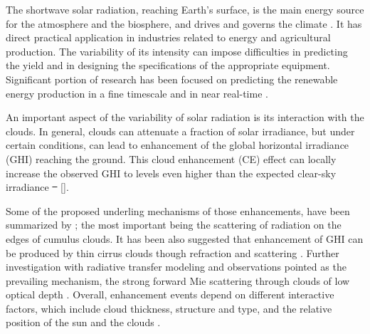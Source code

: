 \documentclass[preprint, 5p,
authoryear]{elsarticle} %
\providecommand{\DIFaddtex}[1]{{\protect\color{blue}\uwave{#1}}} %
\providecommand{\DIFdeltex}[1]{{\protect\color{red}\sout{#1}}}                      %
\providecommand{\DIFaddbegin}{} %
\providecommand{\DIFaddend}{} %
\providecommand{\DIFdelbegin}{} %
\providecommand{\DIFdelend}{} %
\providecommand{\DIFadd}[1]{\texorpdfstring{\DIFaddtex{#1}}{#1}} %
\providecommand{\DIFdel}[1]{\texorpdfstring{\DIFdeltex{#1}}{}} %
\newcommand{\DIFscaledelfig}{0.5}
\newlength{\DIFdelgraphicswidth} %
\newlength{\DIFdelgraphicsheight} %
\newcommand{\DIFaddincludegraphics}[2][]{{\color{blue}\fbox{\DIFOincludegraphics[#1]{#2}}}} %
\newcommand{\DIFdelincludegraphics}[2][]{%
\sbox{\DIFdelgraphicsbox}{\DIFOincludegraphics[#1]{#2}}%
\settoboxwidth{\DIFdelgraphicswidth}{\DIFdelgraphicsbox} %
\settoboxtotalheight{\DIFdelgraphicsheight}{\DIFdelgraphicsbox} %
\scalebox{\DIFscaledelfig}{%
\parbox[b]{\DIFdelgraphicswidth}{\usebox{\DIFdelgraphicsbox}\\[-\baselineskip] \rule{\DIFdelgraphicswidth}{0em}}\llap{\resizebox{\DIFdelgraphicswidth}{\DIFdelgraphicsheight}{%
\setlength{\unitlength}{\DIFdelgraphicswidth}%
\begin{picture}(1,1)%
\thicklines\linethickness{2pt} %
{\color[rgb]{1,0,0}\put(0,0){\framebox(1,1){}}}%
{\color[rgb]{1,0,0}\put(0,0){\line( 1,1){1}}}%
{\color[rgb]{1,0,0}\put(0,1){\line(1,-1){1}}}%
\end{picture}%
}\hspace*{3pt}}} %
} %
\DeclareRobustCommand{\DIFaddbegin}{\DIFOaddbegin \let\includegraphics\DIFaddincludegraphics} %
\DeclareRobustCommand{\DIFaddend}{\DIFOaddend \let\includegraphics\DIFOincludegraphics} %
\DeclareRobustCommand{\DIFdelbegin}{\DIFOdelbegin \let\includegraphics\DIFdelincludegraphics} %
\DeclareRobustCommand{\DIFdelend}{\DIFOaddend \let\includegraphics\DIFOincludegraphics} %
\begin{document}
The shortwave solar radiation, reaching Earth's surface, is the main
energy source for the atmosphere and the biosphere, and drives and
governs the climate \citep{Gray2010}. It has direct practical
application in industries related to energy and agricultural production.
The variability of its intensity can impose difficulties in predicting
the yield and in designing the specifications of the appropriate
equipment. Significant portion of research has been focused on
predicting the renewable energy production in a fine timescale and in
near real-time \citep[for a review see][]{Inman2013, Graabak2016}.

An important aspect of the variability of solar radiation is its
interaction with the clouds. In general, clouds can attenuate a fraction
of solar irradiance, but under certain conditions, can lead to
enhancement of the global horizontal irradiance (GHI) reaching the
ground. This cloud enhancement (CE) effect can locally increase the
observed GHI to levels even higher than the expected clear-sky
irradiance \DIFdelbegin \DIFdel{\mbox{%
\citep[ and references
therein]{Cordero2023, Vamvakas2020, CastillejoCuberos2020, Vamvakas2020}}\hskip0pt%
}\DIFdelend \DIFaddbegin {[}\DIFadd{\mbox{%
\citet{Cordero2023}}\hskip0pt%
; \mbox{%
\citet{Vamvakas2020}}\hskip0pt%
;
\mbox{%
\citet{CastillejoCuberos2020}}\hskip0pt%
; and references therein}{]}\DIFaddend .

Some of the proposed underling mechanisms of those enhancements, have
been summarized by \citet{Gueymard2017}; the most important being the
scattering of radiation on the edges of cumulus clouds. It has been also
suggested that enhancement of GHI can be produced by thin cirrus clouds
though refraction and scattering \citep{Thuillier2013}. Further
investigation with radiative transfer modeling and observations pointed
as the prevailing mechanism, the strong forward Mie scattering through
clouds of low optical depth
\citep{Pecenak2016, Thuillier2013, Yordanov2013, Yordanov2015}. Overall,
enhancement events depend on different interactive factors, which
include cloud thickness, structure and type, and the relative position
of the sun and the clouds \citep{Gueymard2017, Veerman2022}.
\end{document}
